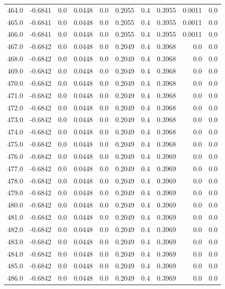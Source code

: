 \begin{longtable}{lrrrrrrrrr}
464.0 & -0.6841 & 0.0 & 0.0448 & 0.0 & 0.2055 & 0.4 & 0.3955 & 0.0011 & 0.0 \\
465.0 & -0.6841 & 0.0 & 0.0448 & 0.0 & 0.2055 & 0.4 & 0.3955 & 0.0011 & 0.0 \\
466.0 & -0.6841 & 0.0 & 0.0448 & 0.0 & 0.2055 & 0.4 & 0.3955 & 0.0011 & 0.0 \\
467.0 & -0.6842 & 0.0 & 0.0448 & 0.0 & 0.2049 & 0.4 & 0.3968 & 0.0 & 0.0 \\
468.0 & -0.6842 & 0.0 & 0.0448 & 0.0 & 0.2049 & 0.4 & 0.3968 & 0.0 & 0.0 \\
469.0 & -0.6842 & 0.0 & 0.0448 & 0.0 & 0.2049 & 0.4 & 0.3968 & 0.0 & 0.0 \\
470.0 & -0.6842 & 0.0 & 0.0448 & 0.0 & 0.2049 & 0.4 & 0.3968 & 0.0 & 0.0 \\
471.0 & -0.6842 & 0.0 & 0.0448 & 0.0 & 0.2049 & 0.4 & 0.3968 & 0.0 & 0.0 \\
472.0 & -0.6842 & 0.0 & 0.0448 & 0.0 & 0.2049 & 0.4 & 0.3968 & 0.0 & 0.0 \\
473.0 & -0.6842 & 0.0 & 0.0448 & 0.0 & 0.2049 & 0.4 & 0.3968 & 0.0 & 0.0 \\
474.0 & -0.6842 & 0.0 & 0.0448 & 0.0 & 0.2049 & 0.4 & 0.3968 & 0.0 & 0.0 \\
475.0 & -0.6842 & 0.0 & 0.0448 & 0.0 & 0.2049 & 0.4 & 0.3968 & 0.0 & 0.0 \\
476.0 & -0.6842 & 0.0 & 0.0448 & 0.0 & 0.2049 & 0.4 & 0.3969 & 0.0 & 0.0 \\
477.0 & -0.6842 & 0.0 & 0.0448 & 0.0 & 0.2049 & 0.4 & 0.3969 & 0.0 & 0.0 \\
478.0 & -0.6842 & 0.0 & 0.0448 & 0.0 & 0.2049 & 0.4 & 0.3969 & 0.0 & 0.0 \\
479.0 & -0.6842 & 0.0 & 0.0448 & 0.0 & 0.2049 & 0.4 & 0.3969 & 0.0 & 0.0 \\
480.0 & -0.6842 & 0.0 & 0.0448 & 0.0 & 0.2049 & 0.4 & 0.3969 & 0.0 & 0.0 \\
481.0 & -0.6842 & 0.0 & 0.0448 & 0.0 & 0.2049 & 0.4 & 0.3969 & 0.0 & 0.0 \\
482.0 & -0.6842 & 0.0 & 0.0448 & 0.0 & 0.2049 & 0.4 & 0.3969 & 0.0 & 0.0 \\
483.0 & -0.6842 & 0.0 & 0.0448 & 0.0 & 0.2049 & 0.4 & 0.3969 & 0.0 & 0.0 \\
484.0 & -0.6842 & 0.0 & 0.0448 & 0.0 & 0.2049 & 0.4 & 0.3969 & 0.0 & 0.0 \\
485.0 & -0.6842 & 0.0 & 0.0448 & 0.0 & 0.2049 & 0.4 & 0.3969 & 0.0 & 0.0 \\
486.0 & -0.6842 & 0.0 & 0.0448 & 0.0 & 0.2049 & 0.4 & 0.3969 & 0.0 & 0.0 \\

\end{longtable}
